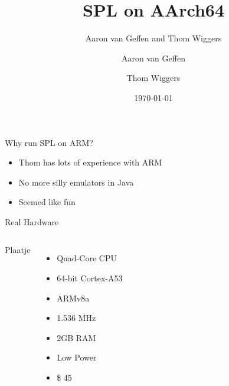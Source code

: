 \documentclass[department=icis, slidenumbers=slide, official=true]{beamerruhuisstijl}
\title{SPL on AArch64}
\subtitle{Aaron van Geffen and Thom Wiggers}
\date{\today}
\author{Aaron van Geffen \and Thom Wiggers}
\begin{document}
\begin{frame}
    \titlepage{}
\end{frame}

\begin{frame}{Why run SPL on ARM?}
    \begin{itemize}
        \item Thom has lots of experience with ARM
        \item No more silly emulators in Java
        \item Seemed like fun
    \end{itemize}
\end{frame}

\begin{frame}{Real Hardware}
    \begin{columns}
        Plaatje

        \begin{itemize}
            \item Quad-Core CPU
            \item 64-bit Cortex-A53
            \item ARMv8a
            \item 1.536 MHz
            \item 2GB RAM
            \item Low Power
            \item \$ 45
        \end{itemize}
    \end{columns}
\end{frame}
\end{document}
